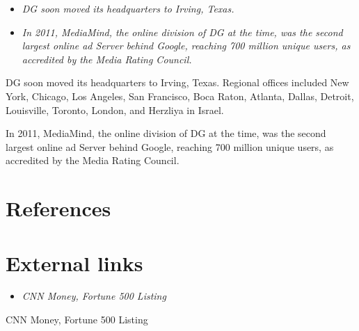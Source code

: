 \begin{itemize}
\item
  \emph{DG soon moved its headquarters to Irving, Texas.}
\item
  \emph{In 2011, MediaMind, the online division of DG at the time, was
  the second largest online ad Server behind Google, reaching 700
  million unique users, as accredited by the Media Rating Council.}
\end{itemize}

DG soon moved its headquarters to Irving, Texas. Regional offices
included New York, Chicago, Los Angeles, San Francisco, Boca Raton,
Atlanta, Dallas, Detroit, Louisville, Toronto, London, and Herzliya in
Israel.

In 2011, MediaMind, the online division of DG at the time, was the
second largest online ad Server behind Google, reaching 700 million
unique users, as accredited by the Media Rating Council.

\section{References}\label{references}

\section{External links}\label{external-links}

\begin{itemize}
\item
  \emph{CNN Money, Fortune 500 Listing}
\end{itemize}

CNN Money, Fortune 500 Listing
